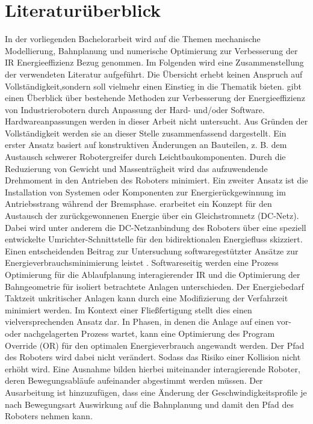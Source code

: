 \section{Literaturüberblick}
In der vorliegenden Bachelorarbeit wird auf die Themen mechanische Modellierung, Bahnplanung und numerische Optimierung zur Verbesserung der IR Energieeffizienz Bezug genommen. Im Folgenden wird eine Zusammenstellung der verwendeten Literatur aufgeführt. Die Übersicht erhebt keinen Anspruch auf Vollständigkeit,sondern soll vielmehr einen Einstieg in die Thematik bieten. \cite{Carabin.2017} gibt einen Überblick über bestehende Methoden zur Verbesserung der Energieeffizienz von Industrierobotern durch Anpassung der Hard- und/oder Software. Hardwareanpassungen werden in dieser Arbeit nicht untersucht. Aus Gründen der Vollständigkeit werden sie an dieser Stelle zusammenfassend dargestellt. Ein erster Ansatz basiert auf konstruktiven Änderungen an Bauteilen, z. B. dem Austausch schwerer Robotergreifer durch Leichtbaukomponenten. Durch die Reduzierung von Gewicht und Massenträgheit wird das aufzuwendende Drehmoment in den Antrieben des Roboters minimiert. Ein zweiter Ansatz ist die Installation von Systemen oder Komponenten zur Energierückgewinnung im Antriebsstrang während der Bremsphase. \cite{Pellicciari.2015} erarbeitet ein Konzept für den Austausch der zurückgewonnenen Energie über ein Gleichstromnetz (DC-Netz). Dabei wird unter anderem die DC-Netzanbindung des Roboters über eine speziell entwickelte Umrichter-Schnittstelle für den bidirektionalen Energiefluss skizziert.
Einen entscheidenden Beitrag zur Untersuchung softwaregestützter Ansätze zur Energieverbrauchsminimierung leistet \cite{Eggers.2019}.
Softwareseitig werden eine Prozess Optimierung für die Ablaufplanung interagierender IR und die Optimierung der Bahngeometrie für isoliert betrachtete Anlagen unterschieden. Der Energiebedarf Taktzeit unkritischer Anlagen kann durch eine Modifizierung der Verfahrzeit minimiert werden. Im Kontext einer Fließfertigung stellt dies einen vielversprechenden Ansatz dar. In Phasen, in denen die Anlage auf einen vor- oder nachgelagerten Prozess wartet, kann eine Optimierung des Program Override (OR) für den optimalen Energieverbrauch angewandt werden. Der Pfad des Roboters wird dabei nicht verändert. Sodass das Risiko einer Kollision nicht erhöht wird. Eine Ausnahme bilden hierbei miteinander interagierende Roboter, deren Bewegungsabläufe aufeinander abgestimmt werden müssen. Der Ausarbeitung \cite{Eggers.2019} ist hinzuzufügen, dass eine Änderung der Geschwindigkeitsprofile je nach Bewegungsart Auswirkung auf die Bahnplanung und damit den Pfad des Roboters nehmen kann. 
